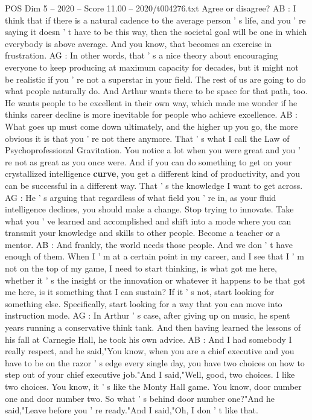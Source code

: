 \begin{textsample}{POS Dim 5 – 2020 – Score 11.00 – 2020/t004276.txt}
Agree or disagree?
AB : I think that if there is a natural cadence to the average person ' s life, and you ' re saying it doesn ' t have to be this way, then the societal goal will be one in which everybody is above average.
And you know, that becomes an exercise in frustration.
AG : In other words, that ' s a nice theory about encouraging everyone to keep producing at maximum capacity for decades, but it might not be realistic if you ' re not a superstar in your field.
The rest of us are going to do what people naturally do.
And Arthur wants there to be space for that path, too.
He wants people to be excellent in their own way, which made me wonder if he thinks career decline is more inevitable for people who achieve excellence.
AB : What goes up must come down ultimately, and the higher up you go, the more obvious it is that you ' re not there anymore.
That ' s what I call the Law of Psychoprofessional Gravitation.
You notice a lot when you were great and you ' re not as great as you once were.
And if you can do something to get on your crystallized intelligence \textbf{curve}, you get a different kind of productivity, and you can be successful in a different way.
That ' s the knowledge I want to get across.
AG : He ' s arguing that regardless of what field you ' re in, as your fluid intelligence declines, you should make a change.
Stop trying to innovate.
Take what you ' ve learned and accomplished and shift into a mode where you can transmit your knowledge and skills to other people.
Become a teacher or a mentor.
AB : And frankly, the world needs those people.
And we don ' t have enough of them.
When I ' m at a certain point in my career, and I see that I ' m not on the top of my game, I need to start thinking, is what got me here, whether it ' s the insight or the innovation or whatever it happens to be that got me here, is it something that I can sustain?
If it ' s not, start looking for something else.
Specifically, start looking for a way that you can move into instruction mode.
AG : In Arthur ' s case, after giving up on music, he spent years running a conservative think tank.
And then having learned the lessons of his fall at Carnegie Hall, he took his own advice.
AB : And I had somebody I really respect, and he said,"You know, when you are a chief executive and you have to be on the razor ' s edge every single day, you have two choices on how to step out of your chief executive job."And I said,"Well, good, two choices.
I like two choices.
You know, it ' s like the Monty Hall game.
You know, door number one and door number two.
So what ' s behind door number one?"And he said,"Leave before you ' re ready."And I said,"Oh, I don ' t like that.

\end{textsample}
